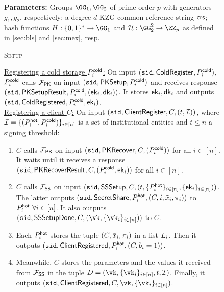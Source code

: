\begin{figure*}
    \centering
    \begin{mdframed}
    \textbf{Parameters:} Groups $\GG_1, \GG_2$ of prime order $p$ with generators $g_1, g_2$, respectively; a degree-$d$ KZG common reference string $\mathsf{crs}$; hash functions $\blshash: \{0,1\}^* \to \GG_1$ and $\lhlhash: \GG_2^2 \to \ZZ_p$ as defined in \ref{sec:bls} and \ref{sec:mex}, resp.
    \begin{center}
        \textsc{Setup}
    \end{center}
    \underline{Registering a cold storage $P_i^{\mathsf{cold}}$:} On input $(\texttt{sid}, \mathsf{ColdRegister}, P_i^{\mathsf{cold}})$, $P_i^{\mathsf{cold}}$ calls $\mathcal{F}_\mathsf{PK}$ on input $(\texttt{sid}, \mathsf{PKSetup}, P_i^{\mathsf{cold}})$ and receives response $(\texttt{sid}, \mathsf{PKSetupResult}, P_i^{\mathsf{cold}}, (\mathsf{ek}_i, \mathsf{dk}_i))$. It stores $\mathsf{ek}_i, \mathsf{dk}_i$ and outputs $(\texttt{sid}, \mathsf{ColdRegistered}, P_i^{\mathsf{cold}}, \mathsf{ek}_i)$.
    \hfill\medskip\\
    \underline{Registering a client $C$:} On input $(\texttt{sid}, \mathsf{ClientRegister}, C, (t, \mathcal{I}))$, where $\mathcal{I} = \{(P_i^{\mathsf{hot}}, P_i^{\mathsf{cold}})\}_{i \in [n]}$ is a set of institutional entities
    and $t \leq n$ a signing threshold:
    \begin{enumerate}
        \item $C$ calls $\mathcal{F}_\mathsf{PK}$ on input $(\texttt{sid}, \mathsf{PKRecover}, C, (P_i^{\mathsf{cold}}))$ for all $i \in [n]$. It waits until it receives a response $(\texttt{sid}, \mathsf{PKRecoverResult}, C, (P_i^{\mathsf{cold}}, \mathsf{ek}_i))$ for all $i \in [n]$.
        \item $C$ calls $\mathcal{F}_\mathsf{SS}$ on input $(\texttt{sid}, \mathsf{SSSetup}, C, (t, \{P_i^{\mathsf{hot}}\}_{i \in [n]}, \{\mathsf{ek}_i\}_{i \in [n]}))$. The latter outputs $(\texttt{sid},\allowbreak \mathsf{SecretShare},\allowbreak P_i^{\mathsf{hot}}, (C, i, \tilde{x}_i, \pi_i))$ to $P_i^{\mathsf{hot}} ~\forall i \in [n]$. It also outputs $(\sid, \mathsf{SSSetupDone}, C,\allowbreak (\vk, \{\vk_i\}_{i \in [n]}))$ to $C$.
        \item Each $P_i^{\mathsf{hot}}$ 
        stores the tuple $(C, \tilde{x}_i, \pi_i)$ in a list $L_i$. Then it outputs $(\texttt{sid}, \mathsf{ClientRegistered}, P_i^{\mathsf{hot}},\allowbreak (C, b_i = 1))$.
        \item Meanwhile, $C$ stores the parameters and the values it received from $\mathcal{F}_\mathsf{SS}$ in the tuple $\clientlist = (\vk, \{\vk_i\}_{i \in [n]}, t, \mathcal{I})$. Finally, it outputs $(\sid, \mathsf{ClientRegistered}, C, \vk, \{\vk_i\}_{i \in [n]})$.

\end{enumerate}
\end{mdframed}
\end{figure*}
